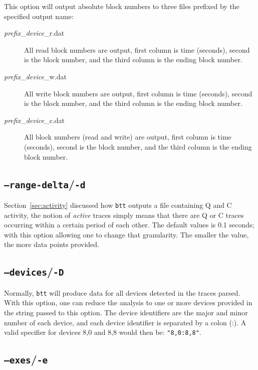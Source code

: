 \documentclass{article}
\begin{document}
  This option will output absolute block numbers to three files prefixed
  by the specified output name:

  \begin{description}
    \item[\emph{prefix}\_\emph{device}\_r.dat] All read block numbers are
    output, first column is time (seconds), second is the block number,
    and the third column is the ending block number.

    \item[\emph{prefix}\_\emph{device}\_w.dat] All write block numbers are
    output, first column is time (seconds), second is the block number,
    and the third column is the ending block number.

    \item[\emph{prefix}\_\emph{device}\_c.dat] All block numbers (read
    and write) are output, first column is time (seconds), second is
    the block number, and the third column is the ending block number.
  \end{description}

\subsection{\label{sec:o-d}\texttt{--range-delta}/\texttt{-d}}

  Section~\ref{sec:activity} discussed how \texttt{btt} outputs a file
  containing Q and C activity, the notion of \emph{active} traces simply
  means that there are Q or C traces occurring within a certain period
  of each other. The default values is 0.1 seconds; with this option
  allowing one to change that granularity. The smaller the value, the
  more data points provided.

\subsection{\label{sec:o-D}\texttt{--devices}/\texttt{-D}}

  Normally, \texttt{btt} will produce data for all devices detected in
  the traces parsed. With this option, one can reduce the analysis to
  one or more devices provided in the string passed to this option. The
  device identifiers are the major and minor number of each device, and
  each device identifier is separated by a colon (:). A valid specifier
  for devices 8,0 and 8,8 would then be: \texttt{"8,0:8,8"}.

\subsection{\label{sec:o-e}\texttt{--exes}/\texttt{-e}}
\end{document}
